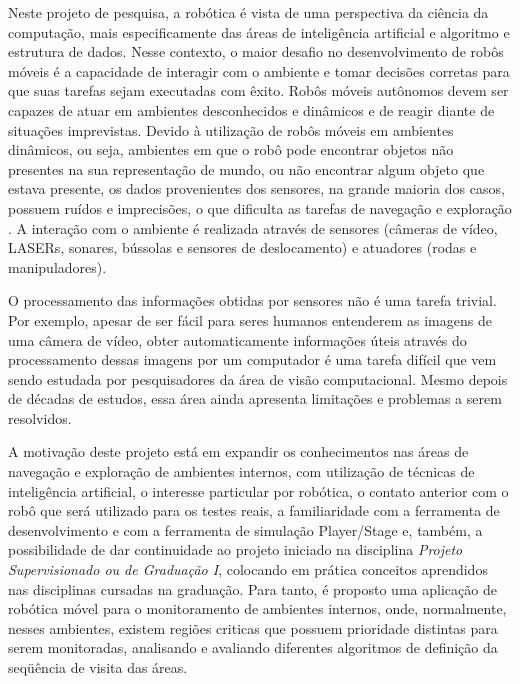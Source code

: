 
Neste projeto de pesquisa, a robótica é vista de uma perspectiva da ciência da computação, mais especificamente das áreas de inteligência artificial e algoritmo e estrutura de dados. Nesse contexto, o maior desafio no desenvolvimento de robôs móveis é a capacidade de interagir com o ambiente e tomar decisões corretas para que suas tarefas sejam executadas com êxito. Robôs móveis autônomos devem ser capazes de atuar em ambientes desconhecidos e dinâmicos e de reagir diante de situações imprevistas. Devido à utilização de robôs móveis em ambientes dinâmicos, ou seja, ambientes em que o robô pode encontrar objetos não presentes na sua representação de mundo, ou não encontrar algum objeto que estava presente, os dados provenientes dos sensores, na grande maioria dos casos, possuem ruídos e imprecisões, o que dificulta as tarefas de navegação e exploração \cite{Bianchi2003}.  A interação com o ambiente é realizada através de sensores (câmeras de vídeo, LASERs, sonares, bússolas e sensores de deslocamento) e atuadores (rodas e manipuladores). 

O processamento das informações obtidas por sensores não é uma tarefa trivial. Por exemplo, apesar de ser fácil para seres humanos entenderem as imagens de uma câmera de vídeo, obter automaticamente informações úteis através do processamento dessas imagens por um computador é uma tarefa difícil que vem sendo estudada por pesquisadores da área de visão computacional. Mesmo depois de décadas de estudos, essa área ainda apresenta limitações e problemas a serem resolvidos.  

A motivação deste projeto está em expandir os conhecimentos nas áreas de navegação e exploração de ambientes internos, com utilização de técnicas de inteligência artificial, o interesse particular por robótica, o contato anterior com o robô que será utilizado para os testes reais, a familiaridade com a ferramenta de desenvolvimento e com a ferramenta de simulação Player/Stage \cite{Gerkey2001} e, também, a possibilidade de dar continuidade ao projeto iniciado na disciplina \textit{Projeto Supervisionado ou de Graduação I}, colocando em prática conceitos aprendidos nas disciplinas cursadas na graduação. Para tanto, é proposto uma aplicação de robótica móvel para o monitoramento de ambientes internos, onde, normalmente, nesses ambientes, existem regiões criticas que possuem prioridade distintas para serem monitoradas, analisando e avaliando diferentes algoritmos de definição da seqüência de visita das áreas.


